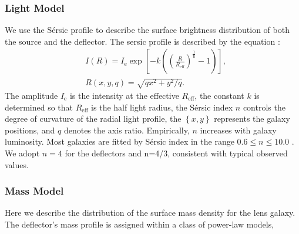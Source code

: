 \documentclass[a4paper,11pt]{article}
\begin{document}
\subsubsection{Light Model}

We use the S\'ersic profile
\cite{1963BAAA....6...41S,1968adga.book.....S} to describe the surface
brightness distribution of both the source and the deflector. The
sersic profile is described by the equation \cite{1993MNRAS.265.1013C}:
%
\begin{eqnarray}
   \label{eq:Intensity}
   &I(R) = I_{\mathrm{e}} \exp\left[-k\left(\left(\frac{R}{R_{\mathrm{eff}}}\right)^{\frac{1}{\mathrm{n}}}-1\right)\right] ,\\
   &R(x,y,q) = \sqrt{qx^2+y^2/q}.
\end{eqnarray}
%
The amplitude $I_{\mathrm{e}}$ is the intensity at the effective
$R_{\mathrm{eff}}$, the constant $k$ is determined so that
$R_{\mathrm{eff}}$ is the half light radius, the S\'ersic index $n$
controls the degree of curvature of the radial light profile, the
$\left\{x,y\right\}$ represents the galaxy positions, and $q$ denotes
the axis ratio. Empirically, $n$ increases with galaxy
luminosity. Most galaxies are fitted by S\'ersic index in the range
$0.6 \le n \le 10.0$ \cite{2006AJ....132.2685M}. We adopt $n=4$ for
the deflectors and n=4/3, consistent with typical observed values.

\subsubsection{Mass Model}

Here we describe the distribution of the surface mass density for the
lens galaxy. The deflector's mass profile is assigned within a class
of power-law models,
\end{document}

